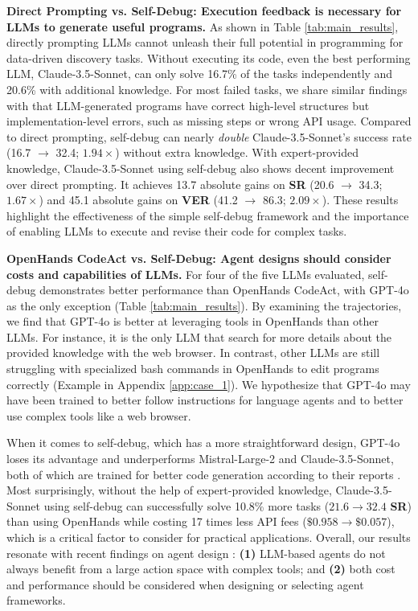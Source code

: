 \documentclass{article} %
\begin{document}
%
\textbf{Direct Prompting vs. Self-Debug: Execution feedback is necessary for LLMs to generate useful programs.}
As shown in Table \ref{tab:main_results}, directly prompting LLMs cannot unleash their full potential in programming for data-driven discovery tasks.
Without executing its code, even the best performing LLM, Claude-3.5-Sonnet, can only solve 16.7\% of the tasks independently and 20.6\% with additional knowledge.
For most failed tasks, we share similar findings with \citet{10.1145/3660767} that LLM-generated programs have correct high-level structures but implementation-level errors, such as missing steps or wrong API usage.
Compared to direct prompting, self-debug can nearly \textit{double} Claude-3.5-Sonnet's success rate (16.7 $\rightarrow$ 32.4; $1.94 \times $) without extra knowledge.
With expert-provided knowledge, Claude-3.5-Sonnet using self-debug also shows decent improvement over direct prompting. 
It achieves 13.7 absolute gains on \textbf{SR} (20.6 $\rightarrow$ 34.3; $1.67 \times $) and 45.1 absolute gains on \textbf{VER} (41.2 $\rightarrow$ 86.3; $2.09 \times $).
These results highlight the effectiveness of the simple self-debug framework and the importance of enabling LLMs to execute and revise their code for complex tasks.
%



%
\textbf{OpenHands CodeAct vs. Self-Debug: Agent designs should consider costs and capabilities of LLMs.}
For four of the five LLMs evaluated, self-debug demonstrates better performance than OpenHands CodeAct, with GPT-4o as the only exception (Table \ref{tab:main_results}).
By examining the trajectories, we find that GPT-4o is better at leveraging tools in OpenHands than other LLMs.
For instance, it is the only LLM that search for more details about the provided knowledge with the web browser.
In contrast, other LLMs are still struggling with specialized bash commands in OpenHands to edit programs correctly (Example in Appendix \ref{app:case_1}). 
We hypothesize that GPT-4o may have been trained to better follow instructions for language agents and to better use complex tools like a web browser.
%

%
When it comes to self-debug, which has a more straightforward design, GPT-4o loses its advantage and underperforms Mistral-Large-2 and Claude-3.5-Sonnet, both of which are trained for better code generation according to their reports \citep{mistral_large_2, claude}.
Most surprisingly, without the help of expert-provided knowledge, Claude-3.5-Sonnet using self-debug can successfully solve 10.8\% more tasks ($21.6 \rightarrow 32.4$ \textbf{SR}) than using OpenHands while costing 17 times less API fees ($\$0.958 \rightarrow \$0.057$), which is a critical factor to consider for practical applications.
Overall, our results resonate with recent findings on agent design \citep{kapoor2024aiagentsmatter, xia2024agentlessdemystifyingllmbasedsoftware}:
\textbf{(1)} LLM-based agents do not always benefit from a large action space with complex tools; and
\textbf{(2)} both cost and performance should be considered when designing or selecting agent frameworks. 
%
\end{document}
